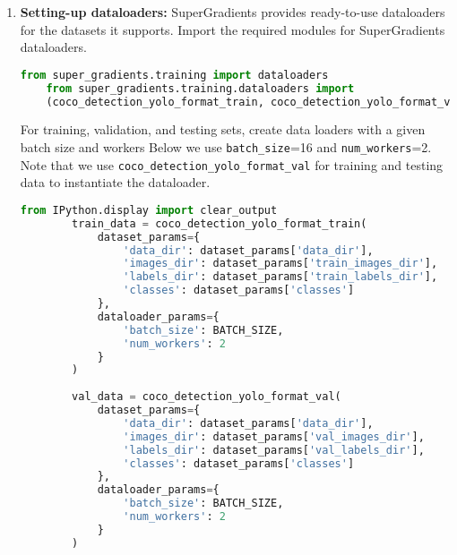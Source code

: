 \begin{enumerate}
     
    \item \textbf{Setting-up dataloaders: }  SuperGradients provides ready-to-use dataloaders for the datasets it supports. Import the required modules for SuperGradients dataloaders.\cite{supergradients}
    \begin{lstlisting}[language=Python, caption=Setting-Up Dataloaders]
    from super_gradients.training import dataloaders
    from super_gradients.training.dataloaders import
    (coco_detection_yolo_format_train, coco_detection_yolo_format_val) 
    \end{lstlisting}
     For training, validation, and testing sets, create data loaders with a given batch size and workers Below we use \texttt{batch\_size}=16 and \texttt{num\_workers}=2. Note that we use \verb|coco_detection_yolo_format_val| for training and testing data to instantiate the dataloader.  
     \begin{lstlisting}[language=Python, caption=Setting-Up Dataloaders]
        from IPython.display import clear_output 
        train_data = coco_detection_yolo_format_train(
            dataset_params={
                'data_dir': dataset_params['data_dir'],
                'images_dir': dataset_params['train_images_dir'],
                'labels_dir': dataset_params['train_labels_dir'],
                'classes': dataset_params['classes']
            },
            dataloader_params={
                'batch_size': BATCH_SIZE,
                'num_workers': 2
            }
        )
        
        val_data = coco_detection_yolo_format_val(
            dataset_params={
                'data_dir': dataset_params['data_dir'],
                'images_dir': dataset_params['val_images_dir'],
                'labels_dir': dataset_params['val_labels_dir'],
                'classes': dataset_params['classes']
            },
            dataloader_params={
                'batch_size': BATCH_SIZE,
                'num_workers': 2
            }
        )
        

\end{lstlisting}
\end{enumerate}
